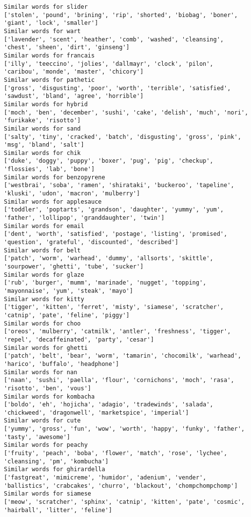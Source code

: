 \documentclass[11pt]{article}
\begin{document}
\begin{Verbatim}[commandchars=\\\{\}]
Similar words for slider
['stolen', 'pound', 'brining', 'rip', 'shorted', 'biobag', 'boner', 'giant', 'lock', 'smaller']
Similar words for wart
['lavender', 'scent', 'heather', 'comb', 'washed', 'cleansing', 'chest', 'sheen', 'dirt', 'ginseng']
Similar words for francais
['illy', 'teeccino', 'jolies', 'dallmayr', 'clock', 'pilon', 'caribou', 'monde', 'master', 'chicory']
Similar words for pathetic
['gross', 'disgusting', 'poor', 'worth', 'terrible', 'satisfied', 'sawdust', 'bland', 'agree', 'horrible']
Similar words for hybrid
['moch', 'ben', 'december', 'sushi', 'cake', 'delish', 'much', 'nori', 'furikake', 'risotto']
Similar words for sand
['salty', 'tiny', 'cracked', 'batch', 'disgusting', 'gross', 'pink', 'msg', 'bland', 'salt']
Similar words for chik
['duke', 'doggy', 'puppy', 'boxer', 'pug', 'pig', 'checkup', 'flossies', 'lab', 'bone']
Similar words for benzopyrene
['westbrai', 'soba', 'ramen', 'shirataki', 'buckeroo', 'tapeline', 'kluski', 'udon', 'macron', 'mulberry']
Similar words for applesauce
['toddler', 'poptarts', 'grandson', 'daughter', 'yummy', 'yum', 'father', 'lollipop', 'granddaughter', 'twin']
Similar words for email
['dent', 'worth', 'satisfied', 'postage', 'listing', 'promised', 'question', 'grateful', 'discounted', 'described']
Similar words for belt
['patch', 'worm', 'warhead', 'dummy', 'allsorts', 'skittle', 'sourpower', 'ghetti', 'tube', 'sucker']
Similar words for glaze
['rub', 'burger', 'mumm', 'marinade', 'nugget', 'topping', 'mayonnaise', 'yum', 'steak', 'mayo']
Similar words for kitty
['tigger', 'kitten', 'ferret', 'misty', 'siamese', 'scratcher', 'catnip', 'pate', 'feline', 'piggy']
Similar words for choo
['oreos', 'mulberry', 'catmilk', 'antler', 'freshness', 'tigger', 'repel', 'decaffeinated', 'party', 'cesar']
Similar words for ghetti
['patch', 'belt', 'bear', 'worm', 'tamarin', 'chocomilk', 'warhead', 'harico', 'buffalo', 'headphone']
Similar words for nan
['naan', 'sushi', 'paella', 'flour', 'cornichons', 'moch', 'rasa', 'risotto', 'ben', 'vous']
Similar words for kombacha
['boldo', 'eh', 'hojicha', 'adagio', 'tradewinds', 'salada', 'chickweed', 'dragonwell', 'marketspice', 'imperial']
Similar words for cute
['yummy', 'gross', 'fun', 'wow', 'worth', 'happy', 'funky', 'father', 'tasty', 'awesome']
Similar words for peachy
['fruity', 'peach', 'boba', 'flower', 'match', 'rose', 'lychee', 'cleansing', 'pm', 'kombucha']
Similar words for ghirardella
['fastgreat', 'mimicreme', 'humidor', 'adenium', 'vender', 'ballistics', 'crabcakes', 'churro', 'blackout', 'chompchompchomp']
Similar words for siamese
['meow', 'scratcher', 'sphinx', 'catnip', 'kitten', 'pate', 'cosmic', 'hairball', 'litter', 'feline']

\end{Verbatim}
\end{document}
